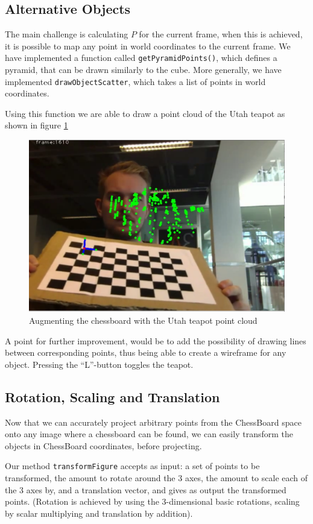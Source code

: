 \documentclass[a4paper,11pt]{article}
\begin{document}
\subsection{Alternative Objects}
The main challenge is calculating $P$ for the current frame, when this is achieved, it is possible to map any point in world coordinates to the current frame. We have implemented a function called \texttt{getPyramidPoints()}, which defines a pyramid, that can be drawn similarly to the cube. More generally, we have implemented \texttt{drawObjectScatter}, which takes a list of points in world coordinates.

Using this function we are able to draw a point cloud of the Utah teapot as shown in figure \ref{fig:teapot}
\begin{figure}[H]
\centering
\includegraphics[width=0.6\linewidth]{teapot}
\caption{Augmenting the chessboard with the Utah teapot point cloud}
\label{fig:teapot}
\end{figure}

A point for further improvement, would be to add the possibility of drawing lines between corresponding points, thus being able to create a wireframe for any object. Pressing the “L”-button toggles the teapot. 

\subsection{Rotation, Scaling and Translation}
Now that we can accurately project arbitrary points from the ChessBoard space onto any image where a chessboard can be found, we can easily transform the objects in ChessBoard coordinates, before projecting.

Our method \texttt{transformFigure} accepts as input: a set of points to be transformed, the amount to rotate around the 3 axes, the amount to scale each of the 3 axes by, and a translation vector, and gives as output the transformed points. (Rotation is achieved by using the 3-dimensional basic rotations, scaling by scalar multiplying and translation by addition).
\end{document}
